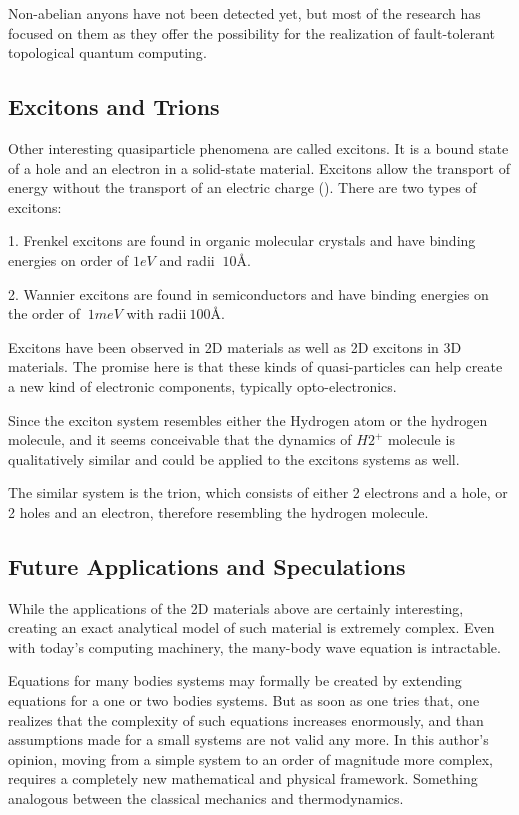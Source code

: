 Non-abelian anyons have not been detected yet, but most of the research has focused on them as they offer the possibility 
for the realization of fault-tolerant topological quantum computing\cite{AnyonsTqc}. 

\subsection*{Excitons and Trions}
Other interesting quasiparticle phenomena are called excitons\cite{Excitons2D1}. It is a bound state of a hole and an electron in a solid-state material. Excitons allow the transport of energy without the transport of an electric charge (). There are two types of excitons: 


1. Frenkel excitons are found in organic molecular crystals\cite{Excitons3} and have binding energies on
order of $ 1eV $ and radii $ ~ 10\text{\AA} $.  


2. Wannier excitons are found in semiconductors\cite{Excitons2} and have binding energies on the order of $ ~1 meV $ with radii$ ~100\text{\AA}. $


Excitons have been observed in 2D materials\cite{Excitons2D2} as
well as 2D excitons in 3D materials. The promise here is that these kinds of quasi-particles can help create a new kind of electronic components, typically opto-electronics.

Since the exciton system resembles either the Hydrogen atom or the hydrogen molecule, and it seems conceivable that the dynamics of  $ H2^{+} $ molecule is qualitatively similar and could be applied to the excitons systems as well.

The similar system is the trion, which consists of either 2 electrons and a hole, or 2 holes and an electron, therefore resembling the hydrogen molecule. 

\subsection*{Future Applications and Speculations}

While the applications of the 2D materials above are certainly interesting, creating an exact analytical  model of such material is extremely complex. Even with today's computing machinery, the many-body wave equation is intractable.  

Equations for many bodies systems may formally be created by extending equations for a one or two bodies systems. But as soon as one tries that, one realizes that the complexity of such equations increases enormously, and than assumptions  made for a small systems are not valid any more. In this author's opinion, moving from a simple system to an order of magnitude more complex, requires a completely new mathematical and physical framework. Something analogous between the classical mechanics and thermodynamics.

